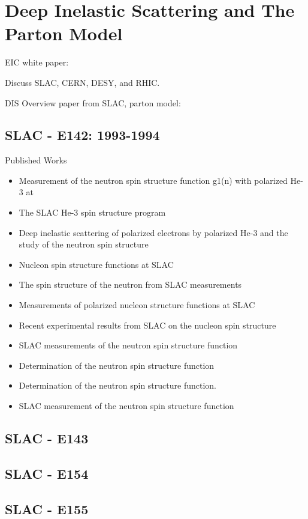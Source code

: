 \clearpage

\section{Deep Inelastic Scattering and The Parton Model}
EIC white paper: ~\cite{Accardi2012}

Discuss SLAC, CERN, DESY, and RHIC.

DIS Overview paper from SLAC, parton model:~\cite{Riordan1992}

\subsection{SLAC - E142: 1993-1994}
Published Works
\begin{itemize}
	\item Measurement of the neutron spin structure function g1(n) with polarized He-3 at 
	\item The SLAC He-3 spin structure program 
	\item Deep inelastic scattering of polarized electrons by polarized He-3 and the study of the neutron spin structure 
	\item Nucleon spin structure functions at SLAC 
	\item The spin structure of the neutron from SLAC measurements 
	\item Measurements of polarized nucleon structure functions at SLAC 
	\item Recent experimental results from SLAC on the nucleon spin structure 
	\item SLAC measurements of the neutron spin structure function 
	\item Determination of the neutron spin structure function 
	\item	Determination of the neutron spin structure function. 
	\item	SLAC measurement of the neutron spin structure function 
\end{itemize}
\subsection{SLAC - E143} 
\subsection{SLAC - E154} 
\subsection{SLAC - E155}

